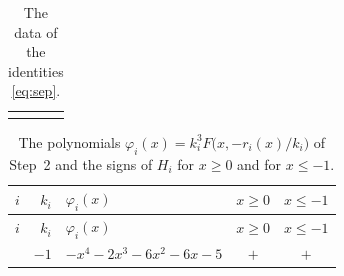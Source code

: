 \documentclass[11pt]{article}
\begin{document}
\begingroup\footnotesize
\setlength{\LTcapwidth}{\textwidth}
\begin{longtable}{@{}ll@{}}
\caption{The data of the identities \eqref{eq:sep}.}\label{tab:sep}\\
\hline\endfirsthead\hline\endhead\hline\endfoot
\end{longtable}
\endgroup

\begingroup\footnotesize
\setlength{\LTcapwidth}{\textwidth}
\begin{longtable}{@{}rrlcc@{}}
\caption{The polynomials $\varphi_i(x)=k_i^3F\bigl(x,-r_i(x)/k_i\bigr)$ of Step~2 and the signs of $H_i$ for $x\geq0$ and for $x\leq-1$.}\label{tab:phi}\\
\hline $i$ & $k_i$ & $\varphi_i(x)$ & $x\geq0$ & $x\leq-1$\\\hline\endfirsthead\hline $i$ & $k_i$ & $\varphi_i(x)$ & $x\geq0$ & $x\leq-1$\\\hline\endhead\hline\endfoot
0 & $-1$ & $-x^{4}-2x^{3}-6x^{2}-6x-5$ & $+$ & $+$\\
\end{longtable}
\endgroup
\end{document}
